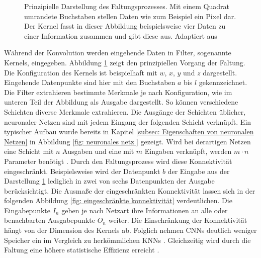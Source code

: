 \begin{figure}[H]
			\caption{Prinzipielle Darstellung des Faltungsprozesses. Mit einem Quadrat umrandete Buchstaben stellen Daten wie zum Beispiel ein Pixel dar. Der Kernel fasst in dieser Abbildung beispielsweise vier Daten zu einer Information zusammen und gibt diese aus. Adaptiert aus \cite{deeplearning}}
			\label{fig: faltung }
		\end{figure}
		
	
				
		Während der Konvolution werden eingehende Daten in Filter, sogenannte Kernels, eingegeben. Abbildung \ref{fig: faltung } zeigt den prinzipiellen Vorgang der Faltung. Die Konfiguration des Kernels ist beispielhaft mit $w$, $x$, $y$ und $z$ dargestellt. Eingehende Datenpunkte sind hier mit den Buchstaben $a$ bis $l$ gekennzeichnet. Die Filter extrahieren bestimmte Merkmale je nach Konfiguration, wie im unteren Teil der Abbildung als Ausgabe dargestellt. So können verschiedene Schichten diverse Merkmale extrahieren. Die Ausgänge der Schichten üblicher, neuronaler Netzen sind mit jedem Eingang der folgenden Schicht verknüpft. Ein typischer Aufbau wurde bereits in Kapitel \ref{subsec: Eigenschaften von neuronalen Netzen} in Abbildung \ref{fig: neuronales netz } gezeigt. Wird bei derartigen Netzen eine Schicht mit $n$ Ausgaben und eine mit $m$ Eingaben verknüpft, werden $m \cdot n$ Parameter benötigt \cite{deeplearning}. Durch den Faltungsprozess wird diese Konnektivität eingeschränkt. Beispielsweise wird der Datenpunkt $b$ der Eingabe aus der Darstellung \ref{fig: faltung } lediglich in zwei von sechs Datenpunkten der Ausgabe berücksichtigt. Die Ausmaße der eingeschränkten Konnektivität lassen sich in der folgenden Abbildung \ref{fig: eingeschränkte konnektivität} verdeutlichen. Die Eingabepunkte $I_n$ geben je nach Netzart ihre Informationen an alle oder benachbarten Ausgabepunkte $O_n$ weiter. Die Einschränkung der Konnektivität hängt von der Dimension des Kernels ab. Folglich nehmen CNNs deutlich weniger Speicher ein im Vergleich zu herkömmlichen KNNs \cite{deeplearning}. Gleichzeitig wird durch die Faltung eine höhere statistische Effizienz erreicht \cite{deeplearning}.\\
		

